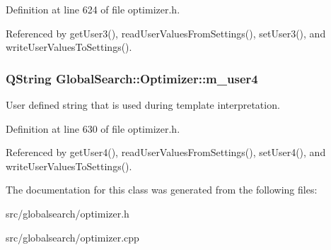 Definition at line 624 of file optimizer.\-h.



Referenced by get\-User3(), read\-User\-Values\-From\-Settings(), set\-User3(), and write\-User\-Values\-To\-Settings().

\hypertarget{classGlobalSearch_1_1Optimizer_aefab51b84978d2fb49eaf3585894808a}{
\subsubsection[{m\-\_\-user4}]{\setlength{\rightskip}{0pt plus 5cm}Q\-String Global\-Search\-::\-Optimizer\-::m\-\_\-user4\hspace{0.3cm}{\ttfamily [protected]}}}\label{classGlobalSearch_1_1Optimizer_aefab51b84978d2fb49eaf3585894808a}
User defined string that is used during template interpretation. 

Definition at line 630 of file optimizer.\-h.



Referenced by get\-User4(), read\-User\-Values\-From\-Settings(), set\-User4(), and write\-User\-Values\-To\-Settings().



The documentation for this class was generated from the following files\-:\begin{DoxyCompactItemize}
\item 
src/globalsearch/optimizer.\-h\item 
src/globalsearch/optimizer.\-cpp\end{DoxyCompactItemize}
